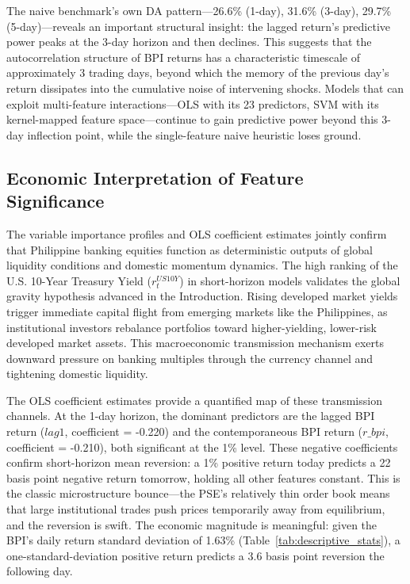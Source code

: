 \documentclass[12pt]{article}
\begin{document}
The naive benchmark's own DA pattern---26.6\% (1-day), 31.6\% (3-day), 29.7\% (5-day)---reveals an important structural insight: the lagged return's predictive power peaks at the 3-day horizon and then declines. This suggests that the autocorrelation structure of BPI returns has a characteristic timescale of approximately 3 trading days, beyond which the memory of the previous day's return dissipates into the cumulative noise of intervening shocks. Models that can exploit multi-feature interactions---OLS with its 23 predictors, SVM with its kernel-mapped feature space---continue to gain predictive power beyond this 3-day inflection point, while the single-feature naive heuristic loses ground.

\subsection{Economic Interpretation of Feature Significance}

The variable importance profiles and OLS coefficient estimates jointly confirm that Philippine banking equities function as deterministic outputs of global liquidity conditions and domestic momentum dynamics. The high ranking of the U.S. 10-Year Treasury Yield ($r^{US10Y}_t$) in short-horizon models validates the global gravity hypothesis advanced in the Introduction. Rising developed market yields trigger immediate capital flight from emerging markets like the Philippines, as institutional investors rebalance portfolios toward higher-yielding, lower-risk developed market assets. This macroeconomic transmission mechanism exerts downward pressure on banking multiples through the currency channel and tightening domestic liquidity.

The OLS coefficient estimates provide a quantified map of these transmission channels. At the 1-day horizon, the dominant predictors are the lagged BPI return ($lag1$, coefficient = -0.220) and the contemporaneous BPI return ($r\_bpi$, coefficient = -0.210), both significant at the 1\% level. These negative coefficients confirm short-horizon mean reversion: a 1\% positive return today predicts a 22 basis point negative return tomorrow, holding all other features constant. This is the classic microstructure bounce---the PSE's relatively thin order book means that large institutional trades push prices temporarily away from equilibrium, and the reversion is swift. The economic magnitude is meaningful: given the BPI's daily return standard deviation of 1.63\% (Table~\ref{tab:descriptive_stats}), a one-standard-deviation positive return predicts a 3.6 basis point reversion the following day.
\end{document}
